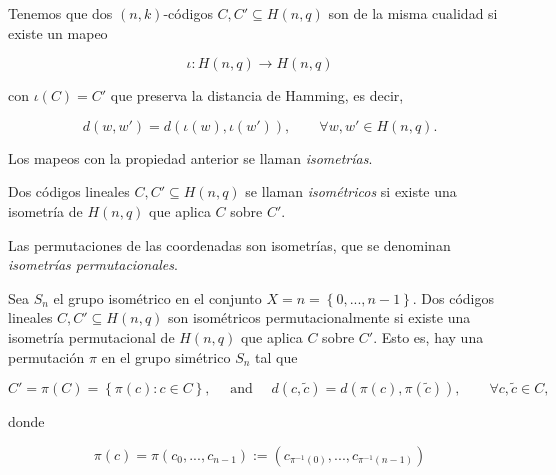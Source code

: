 Tenemos que dos $(n,k)$-códigos $C, C' \subseteq H(n,q)$ son de la misma cualidad si existe un mapeo

$$\iota : H(n,q) \rightarrow H(n,q)$$

con $\iota(C) = C'$ que preserva la distancia de Hamming, es decir, 

$$d(w,w') = d(\iota (w), \iota(w')), \qquad \forall w,w' \in H(n,q).$$

Los mapeos con la propiedad anterior se llaman \emph{isometrías}.

\begin{definition}
    Dos códigos lineales $C, C' \subseteq H(n,q)$ se llaman \emph{isométricos} si existe una isometría de $H(n,q)$ que aplica $C$ sobre $C'$.
\end{definition}

Las permutaciones de las coordenadas son isometrías, que se denominan \emph{isometrías permutacionales}.

\begin{definition}
    Sea $S_n$ el grupo isométrico en el conjunto $X = n = \left\{ 0,..., n-1 \right\}$. Dos códigos lineales $C, C' \subseteq H(n,q)$ son isométricos permutacionalmente si existe una isometría permutacional de $H(n,q)$ que aplica $C$ sobre $C'$. Esto es, hay una permutación $\pi$ en el grupo simétrico $S_n$ tal que 

    $$ C' = \pi (C) = \left\{ \pi(c) : c \in C \right\}, \quad \text{ and } \quad d(c, \tilde{c}) = d(\pi(c), \pi(\tilde{c})), \qquad \forall c,\tilde{c} \in C,$$ 

    donde
    
    $$\pi(c) = \pi(c_0,...,c_{n-1}) := \left( c_{\pi ^{-1} (0)}, ..., c_{\pi ^{-1} (n-1)} \right)$$
\end{definition}
